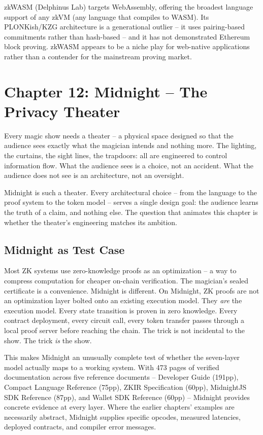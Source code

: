 \documentclass[
  11pt,
  openany]{report}
\begin{document}
zkWASM (Delphinus Lab) targets WebAssembly, offering the broadest language
support of any zkVM (any language that compiles to WASM). Its PLONKish/KZG
architecture is a generational outlier -- it uses pairing-based commitments
rather than hash-based -- and it has not demonstrated Ethereum block proving.
zkWASM appears to be a niche play for web-native applications rather than a
contender for the mainstream proving market.

\chapter{Chapter 12: Midnight -- The Privacy
Theater}\label{chapter-12-midnight-the-privacy-theater}

Every magic show needs a theater -- a physical space designed so that the
audience sees exactly what the magician intends and nothing more. The lighting,
the curtains, the sight lines, the trapdoors: all are engineered to control
information flow. What the audience sees is a choice, not an accident. What the
audience does not see is an architecture, not an oversight.

Midnight is such a theater. Every architectural choice -- from the language to
the proof system to the token model -- serves a single design goal: the audience
learns the truth of a claim, and nothing else. The question that animates this
chapter is whether the theater's engineering matches its ambition.

\section{Midnight as Test Case}\label{midnight-as-test-case}

Most ZK systems use zero-knowledge proofs as an optimization -- a way to
compress computation for cheaper on-chain verification. The magician's sealed
certificate is a convenience. Midnight is different. On Midnight, ZK proofs are
not an optimization layer bolted onto an existing execution model. They
\emph{are} the execution model. Every state transition is proven in zero
knowledge. Every contract deployment, every circuit call, every token transfer
passes through a local proof server before reaching the chain. The trick is not
incidental to the show. The trick \emph{is} the show.

This makes Midnight an unusually complete test of whether the seven-layer model
actually maps to a working system. With 473 pages of verified documentation
across five reference documents -- Developer Guide (191pp), Compact Language
Reference (75pp), ZKIR Specification (60pp), MidnightJS SDK Reference (87pp),
and Wallet SDK Reference (60pp) -- Midnight provides concrete evidence at every
layer. Where the earlier chapters' examples are necessarily abstract, Midnight
supplies specific opcodes, measured latencies, deployed contracts, and compiler
error messages.
\end{document}
